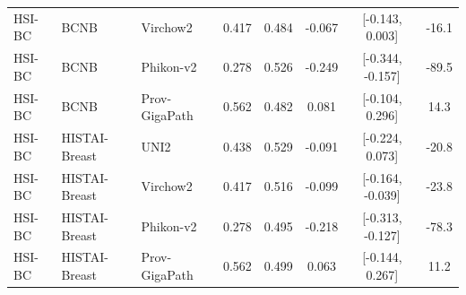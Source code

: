 \begin{table}[H]
{\begin{tabular}{l l l c c c c c}
HSI-BC & BCNB & Virchow2 & 0.417 & 0.484 & -0.067 & [-0.143, 0.003] & -16.1 \\
HSI-BC & BCNB & Phikon-v2 & 0.278 & 0.526 & -0.249 & [-0.344, -0.157] & -89.5 \\
HSI-BC & BCNB & Prov-GigaPath & 0.562 & 0.482 & 0.081 & [-0.104, 0.296] & 14.3 \\
\midrule
HSI-BC & HISTAI-Breast & UNI2 & 0.438 & 0.529 & -0.091 & [-0.224, 0.073] & -20.8 \\
HSI-BC & HISTAI-Breast & Virchow2 & 0.417 & 0.516 & -0.099 & [-0.164, -0.039] & -23.8 \\
HSI-BC & HISTAI-Breast & Phikon-v2 & 0.278 & 0.495 & -0.218 & [-0.313, -0.127] & -78.3 \\
HSI-BC & HISTAI-Breast & Prov-GigaPath & 0.562 & 0.499 & 0.063 & [-0.144, 0.267] & 11.2 \\
\midrule
\bottomrule
\end{tabular}
}
\end{table}

